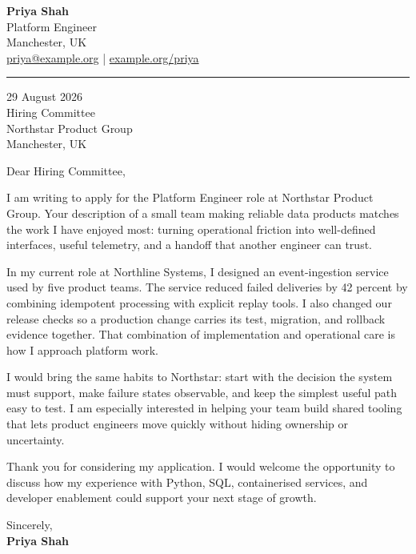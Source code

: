 \documentclass[11pt]{article}
\newcommand{\ruleline}{\par\vspace{5pt}\color{accent}\rule{\linewidth}{1.2pt}\color{black}\vspace{12pt}}
\begin{document}
\begin{flushright}
  {\Large\bfseries\color{accent} Priya Shah}\\
  Platform Engineer\\
  Manchester, UK\\
  \href{mailto:priya@example.org}{priya@example.org} \enspace|\enspace
  \href{https://example.org/priya}{example.org/priya}
\end{flushright}
\ruleline
\begin{flushleft}
  29 August 2026\\[8pt]
  Hiring Committee\\
  Northstar Product Group\\
  Manchester, UK
\end{flushleft}
\vspace{7pt}
Dear Hiring Committee,

I am writing to apply for the Platform Engineer role at Northstar Product
Group. Your description of a small team making reliable data products matches
the work I have enjoyed most: turning operational friction into well-defined
interfaces, useful telemetry, and a handoff that another engineer can trust.

In my current role at Northline Systems, I designed an event-ingestion service
used by five product teams. The service reduced failed deliveries by 42 percent
by combining idempotent processing with explicit replay tools. I also changed
our release checks so a production change carries its test, migration, and
rollback evidence together. That combination of implementation and operational
care is how I approach platform work.

I would bring the same habits to Northstar: start with the decision the system
must support, make failure states observable, and keep the simplest useful
path easy to test. I am especially interested in helping your team build
shared tooling that lets product engineers move quickly without hiding
ownership or uncertainty.

Thank you for considering my application. I would welcome the opportunity to
discuss how my experience with Python, SQL, containerised services, and
developer enablement could support your next stage of growth.

Sincerely,\\[8pt]
{\bfseries Priya Shah}
\end{document}
